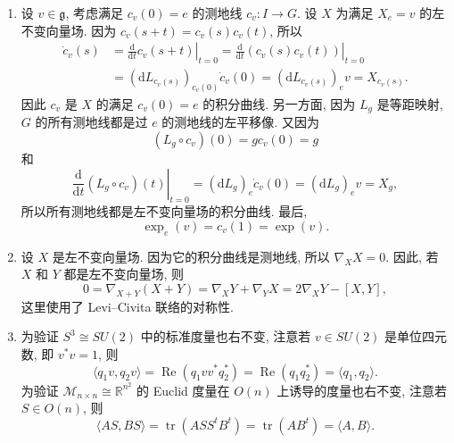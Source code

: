 \begin{description}[font=\normalfont,leftmargin=2em,labelwidth=1.5em]
\begin{enumerate}[label=(\alph*),ref=\alph*,leftmargin=*]
\[
  \gamma(-t_0)=c_v(t_0)c_v(-t_0)=c_v(t_0)(c_v(t_0))^{-1}=e
\]
和 $\gamma(0)=c_v(t_0)$. 因为 $e$ 与 $c_v(t_0)$ 由两条长度均为 $t_0\lVert v\rVert<\varepsilon$ 的测地线连接, 所以这两条测地线必重合. 因而对所有使两边都有定义的 $t\in I$, 有 $\gamma(t)=c_v(t_0+t)$. 若 $b<+\infty$, 则 $\gamma$ 可将 $c_v$ 延拓到 $I$ 以外, 这是不可能的. 此外, 由 $c_v(-t)=(c_v(t))^{-1}$ 得 $a=-\infty$, 因而 $c_v$ 对所有 $t\in\mathbb{R}$ 都有定义. 因为对每对满足 $|t_0|<\varepsilon$ 的 $t,t_0\in\mathbb{R}$, 有
\[
  c_v(t_0+t)=\gamma(t)=c_v(t_0)c_v(t),
\]
给定 $s\in\mathbb{R}$ 后, 选取 $m>0$ 使 $\left|\frac{s}{m}\right|<\varepsilon$, 则有
\begin{align*}
  c_v(s+t)
  &=c_v\left(\frac{m}{m}s+t\right)=c_v\left(\frac{s}{m}\right)c_v\left(\frac{m-1}{m}s+t\right)\\
  &=\cdots=c_v\left(\frac{s}{m}\right)\cdots c_v\left(\frac{s}{m}\right)c_v(t)=c_v(s)c_v(t).
\end{align*}
\item 设 $v\in\mathfrak{g}$, 考虑满足 $c_v(0)=e$ 的测地线 $c_v:I\to G$. 设 $X$ 为满足 $X_e=v$ 的左不变向量场. 因为 $c_v(s+t)=c_v(s)c_v(t)$, 所以
\begin{align*}
  \dot c_v(s)&=\left.\frac{\mathrm{d}}{\mathrm{d}t}c_v(s+t)\right|_{t=0}
    =\left.\frac{\mathrm{d}}{\mathrm{d}t}(c_v(s)c_v(t))\right|_{t=0}\\
  &=(\mathrm{d}L_{c_v(s)})_{c_v(0)}\dot c_v(0)
    =(\mathrm{d}L_{c_v(s)})_ev=X_{c_v(s)}.
\end{align*}
因此 $c_v$ 是 $X$ 的满足 $c_v(0)=e$ 的积分曲线. 另一方面, 因为 $L_g$ 是等距映射, $G$ 的所有测地线都是过 $e$ 的测地线的左平移像. 又因为
\[
  (L_g\circ c_v)(0)=gc_v(0)=g
\]
和
\[
  \left.\frac{\mathrm{d}}{\mathrm{d}t}(L_g\circ c_v)(t)\right|_{t=0}
  =(\mathrm{d}L_g)_e\dot c_v(0)=(\mathrm{d}L_g)_ev=X_g,
\]
所以所有测地线都是左不变向量场的积分曲线. 最后,
\[
  \exp_e(v)=c_v(1)=\exp(v).
\]
\item 设 $X$ 是左不变向量场. 因为它的积分曲线是测地线, 所以 $\nabla_XX=0$. 因此, 若 $X$ 和 $Y$ 都是左不变向量场, 则
\[
  0=\nabla_{X+Y}(X+Y)=\nabla_XY+\nabla_YX=2\nabla_XY-[X,Y],
\]
这里使用了 Levi–Civita 联络的对称性.
\item 为验证 $S^3\cong SU(2)$ 中的标准度量也右不变, 注意若 $v\in SU(2)$ 是单位四元数, 即 $v^*v=1$, 则
\[
  \langle q_1v,q_2v\rangle=\operatorname{Re}(q_1vv^*q_2^*)=\operatorname{Re}(q_1q_2^*)=\langle q_1,q_2\rangle.
\]
为验证 $\mathcal{M}_{n\times n}\cong\mathbb{R}^{n^2}$ 的 Euclid 度量在 $O(n)$ 上诱导的度量也右不变, 注意若 $S\in O(n)$, 则
\[
  \langle AS,BS\rangle=\operatorname{tr}(ASS^tB^t)=\operatorname{tr}(AB^t)=\langle A,B\rangle.
\]
\end{enumerate}
\end{description}

